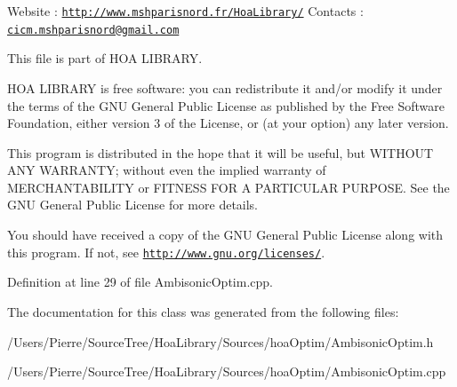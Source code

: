 Website \-: \href{http://www.mshparisnord.fr/HoaLibrary/}{\tt http\-://www.\-mshparisnord.\-fr/\-Hoa\-Library/} Contacts \-: \href{mailto:cicm.mshparisnord@gmail.com}{\tt cicm.\-mshparisnord@gmail.\-com}

This file is part of H\-O\-A L\-I\-B\-R\-A\-R\-Y.

H\-O\-A L\-I\-B\-R\-A\-R\-Y is free software\-: you can redistribute it and/or modify it under the terms of the G\-N\-U General Public License as published by the Free Software Foundation, either version 3 of the License, or (at your option) any later version.

This program is distributed in the hope that it will be useful, but W\-I\-T\-H\-O\-U\-T A\-N\-Y W\-A\-R\-R\-A\-N\-T\-Y; without even the implied warranty of M\-E\-R\-C\-H\-A\-N\-T\-A\-B\-I\-L\-I\-T\-Y or F\-I\-T\-N\-E\-S\-S F\-O\-R A P\-A\-R\-T\-I\-C\-U\-L\-A\-R P\-U\-R\-P\-O\-S\-E. See the G\-N\-U General Public License for more details.

You should have received a copy of the G\-N\-U General Public License along with this program. If not, see \href{http://www.gnu.org/licenses/}{\tt http\-://www.\-gnu.\-org/licenses/}. 

Definition at line 29 of file Ambisonic\-Optim.\-cpp.



The documentation for this class was generated from the following files\-:\begin{DoxyCompactItemize}
\item 
/\-Users/\-Pierre/\-Source\-Tree/\-Hoa\-Library/\-Sources/hoa\-Optim/Ambisonic\-Optim.\-h\item 
/\-Users/\-Pierre/\-Source\-Tree/\-Hoa\-Library/\-Sources/hoa\-Optim/Ambisonic\-Optim.\-cpp\end{DoxyCompactItemize}
